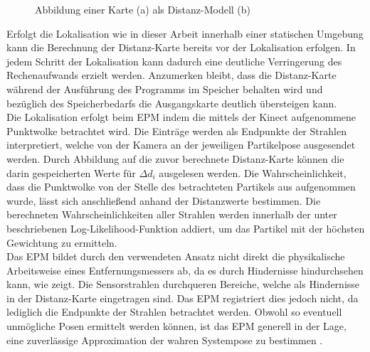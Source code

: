 \begin{figure}[!ht]
	\begin{center}
	
	\hspace{5mm}
	\caption{Abbildung einer Karte (a) als Distanz-Modell (b)}
	\label{fig.dist_map}
	\end{center}
\end{figure}

Erfolgt die Lokalisation wie in dieser Arbeit innerhalb einer statischen Umgebung kann die Berechnung der Distanz-Karte bereits vor der Lokalisation erfolgen. In jedem Schritt der Lokalisation kann dadurch eine deutliche Verringerung des Rechenaufwands erzielt werden. Anzumerken bleibt, dass die Distanz-Karte während der Ausführung des Programms im Speicher behalten wird und bezüglich des Speicherbedarfs die Ausgangskarte deutlich übersteigen kann.\\

Die Lokalisation erfolgt beim EPM indem die mittels der Kinect aufgenommene Punktwolke betrachtet wird. Die Einträge werden als Endpunkte der Strahlen interpretiert, welche von der Kamera an der jeweiligen Partikelpose ausgesendet werden. Durch Abbildung auf die zuvor berechnete Distanz-Karte können die darin gespeicherten Werte für ${\Delta d}_i$ ausgelesen werden. Die Wahrscheinlichkeit, dass die Punktwolke von der Stelle des betrachteten Partikels aus aufgenommen wurde, lässt sich anschließend anhand der Distanzwerte bestimmen. Die berechneten Wahrscheinlichkeiten aller Strahlen werden innerhalb der unter  beschriebenen Log-Likelihood-Funktion addiert, um das Partikel mit der höchsten Gewichtung zu ermitteln.\\

Das EPM bildet durch den verwendeten Ansatz nicht direkt die physikalische Arbeitsweise eines Entfernungsmessers ab, da es durch Hindernisse \glqq hindurchsehen\grqq{} kann, wie  zeigt. Die Sensorstrahlen durchqueren Bereiche, welche als Hindernisse in der Distanz-Karte eingetragen sind. Das EPM registriert dies jedoch nicht, da lediglich die Endpunkte der Strahlen betrachtet werden. Obwohl so eventuell unmögliche Posen ermittelt werden können, ist das EPM generell in der Lage, eine zuverlässige Approximation der wahren Systempose zu bestimmen \cite{Konolige1999}.

